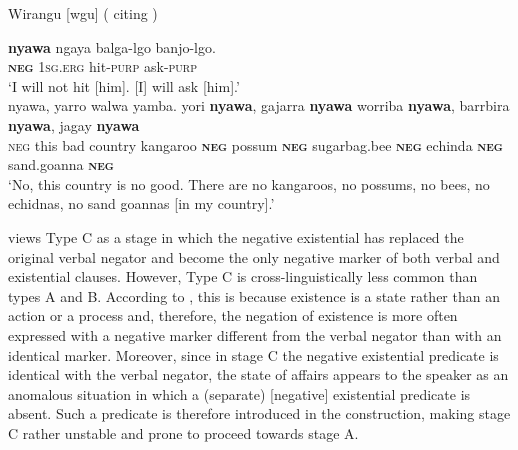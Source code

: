 \documentclass[output=paper,chinesefont,colorlinks,citecolor=brown]{langscibook}
\begin{document}
\begin{exe}
\ex Wirangu [wgu] ( citing \citet[363, 661]{Tsunoda2011}) \label{ex:wirangu1}
\begin{xlist}
\ex \label{ex:wirangu1a}
\gll \textbf{nyawa} ngaya balga-lgo banjo-lgo.\\
\textsc{\textbf{neg}} 1\textsc{sg}\textsc{.erg} hit\textsc{-purp} ask\textsc{-purp}\\
\glt `I will not hit [him]. [I] will ask [him].'\\
\ex \label{ex:wirangu1b}
\gll nyawa, yarro walwa yamba. yori \textbf{nyawa}, gajarra \textbf{nyawa} worriba \textbf{nyawa}, barrbira \textbf{nyawa}, jagay \textbf{nyawa}\\
\textsc{neg} this bad country kangaroo \textsc{\textbf{neg}} possum \textbf{\textsc{neg}} sugarbag.bee \textbf{\textsc{neg}} echinda \textbf{\textsc{neg}} sand.goanna \textbf{\textsc{neg}}\\
\glt `No, this country is no good. There are no kangaroos, no possums, no bees, no echidnas, no sand goannas [in my country].'\\
\end{xlist}
\end{exe}
\citet[11--12]{Croft1991} views Type C as a stage in which the negative existential has replaced the original verbal negator and become the only negative marker of both verbal and existential clauses. However, Type C is cross-linguistically less common than types A and B. According to \citet{Croft1991}, this is because existence is a state rather than an action or a process and, therefore, the negation of existence is more often expressed with a negative marker different from the verbal negator than with an identical marker. Moreover, since in stage C the negative existential predicate is identical with the verbal negator, the state of affairs appears to the speaker as an anomalous situation in which a (separate) [negative] existential predicate is absent. Such a predicate is therefore introduced in the construction, making stage C rather unstable and prone to proceed towards stage A.
\end{document}
